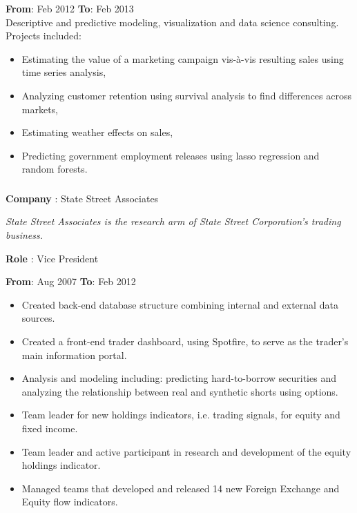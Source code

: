 \documentclass[
]{article}
\providecommand{\tightlist}{%
  \setlength{\itemsep}{0pt}\setlength{\parskip}{0pt}}
\begin{document}
\textbf{From}: Feb 2012 \hspace{0.5in}  \textbf{To}: Feb 2013\\
Descriptive and predictive modeling, visualization and data science
consulting. Projects included:

\begin{itemize}
\tightlist
\item
  Estimating the value of a marketing campaign vis-à-vis resulting sales
  using time series analysis,
\item
  Analyzing customer retention using survival analysis to find
  differences across markets,
\item
  Estimating weather effects on sales,
\item
  Predicting government employment releases using lasso regression and
  random forests.
\end{itemize}

\hypertarget{ssa}{%
\subsubsection{}\label{ssa}}
\begin{flushleft}
\textbf{Company} : State Street Associates
\end{flushleft}

{\hspace{0.1in} \footnotesize \emph{State Street Associates is the research arm of State Street Corporation's trading business.}}


\begin{flushleft}
\textbf{Role} : Vice President
\end{flushleft}

\textbf{From}: Aug 2007 \hspace{0.5in}  \textbf{To}: Feb 2012 \\

 

  \begin{itemize}
  \tightlist
  \item
    Created back-end database structure combining internal and external
    data sources.
  \item
    Created a front-end trader dashboard, using Spotfire, to serve as
    the trader's main information portal.
  \item
    Analysis and modeling including: predicting hard-to-borrow
    securities and analyzing the relationship between real and synthetic
    shorts using options.

  \item
    Team leader for new holdings indicators, i.e. trading signals, for
    equity and fixed income.
  \item
    Team leader and active participant in research and development of
    the equity holdings indicator.
  \item
    Managed teams that developed and released 14 new Foreign Exchange
    and Equity flow indicators.
  \end{itemize}
\end{document}
